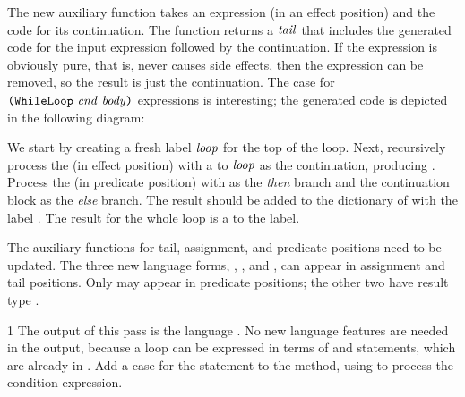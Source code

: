 \documentclass[7x10]{TimesAPriori_MIT}%
\def\pythonEd{1}
\def\edition{1}
\newcommand{\pythonColor}[0]{}
\numberwithin{theorem}{chapter}
\numberwithin{definition}{chapter}
\numberwithin{equation}{chapter}
\begin{document}
{The new auxiliary function  takes an
expression (in an effect position) and the code for its
continuation. The function returns a $\mathit{tail}$ that includes the
generated code for the input expression followed by the
continuation. If the expression is obviously pure, that is, never
causes side effects, then the expression can be removed, so the result
is just the continuation.
%
The case for $\texttt{(}\texttt{WhileLoop}~\mathit{cnd}~\mathit{body}\texttt{)}$ expressions is
interesting; the generated code is depicted in the following diagram:
\begin{center}
  \begin{minipage}{0.3\textwidth}
\end{minipage}
\end{center}
We start by creating a fresh label $\mathit{loop}$ for the top of the
loop.  Next, recursively process the  (in effect position)
with a  to $\mathit{loop}$ as the continuation, producing
. Process the  (in predicate position) with
 as the \emph{then} branch and the continuation block as the
\emph{else} branch. The result should be added to the dictionary of
 with the label . The result for the
whole  loop is a  to the  label.

The auxiliary functions for tail, assignment, and predicate positions
need to be updated. The three new language forms, ,
, and , can appear in assignment and tail
positions.  Only  may appear in predicate positions; the
other two have result type .

\fi}
%
{\if\edition\pythonEd\pythonColor
%
The output of this pass is the language \LangCIf{}. No new language
features are needed in the output, because a  loop can be
expressed in terms of  and  statements, which are
already in \LangCIf{}.
%  
Add a case for the  statement to the
 method, using  to process
the condition expression.
%
\fi}
\end{document}
